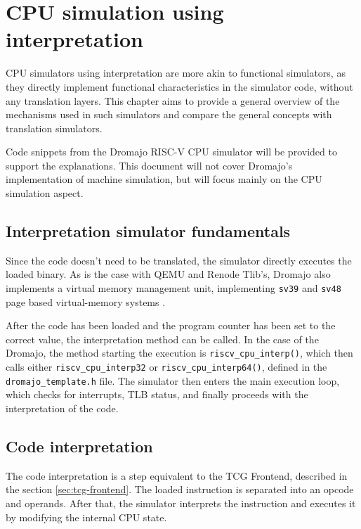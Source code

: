 
\chapter{CPU simulation using interpretation}
\label{chap:interpret}

CPU simulators using interpretation are more akin to functional simulators, as they directly implement
functional characteristics in the simulator code, without any translation layers. This chapter aims to provide a
general overview of the mechanisms used in such simulators and compare the general concepts with translation
simulators.

Code snippets from the Dromajo RISC-V CPU simulator will be provided to support the explanations. This document will not
cover Dromajo's implementation of machine simulation, but will focus mainly on the CPU simulation aspect.

\section*{Interpretation simulator fundamentals}

Since the code doesn't need to be translated, the simulator directly executes the loaded binary. As is the case with
QEMU and Renode Tlib's, Dromajo also implements a virtual memory management unit, implementing \texttt{sv39} and
\texttt{sv48} page based virtual-memory systems \cite{RISC-PRIV}.

After the code has been loaded and the program counter has been set to the correct value, the interpretation method
can be called. In the case of the Dromajo, the method starting the execution is \texttt{riscv\_cpu\_interp()}, which
then calls either \texttt{riscv\_cpu\_interp32} or \texttt{riscv\_cpu\_interp64()}, defined in the \texttt{dromajo\_template.h} file. The simulator then
enters the main execution loop, which checks for interrupts, TLB status, and finally proceeds with the interpretation of the code.

\section{Code interpretation}

The code interpretation is a step equivalent to the TCG Frontend, described in the section \ref{sec:tcg-frontend}.
The loaded instruction is separated into an opcode and operands. After that, the simulator interprets the instruction
and executes it by modifying the internal CPU state.

